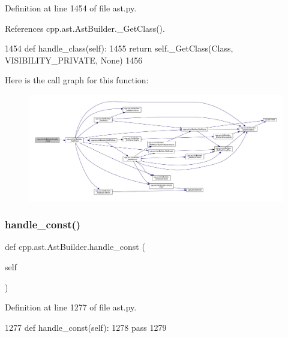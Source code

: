 Definition at line 1454 of file ast.\+py.



References cpp.\+ast.\+Ast\+Builder.\+\_\+\+Get\+Class().


\begin{DoxyCode}
1454     \textcolor{keyword}{def }handle\_class(self):
1455         \textcolor{keywordflow}{return} self.\_GetClass(Class, VISIBILITY\_PRIVATE, \textcolor{keywordtype}{None})
1456 
\end{DoxyCode}
Here is the call graph for this function\+:
\nopagebreak
\begin{figure}[H]
\begin{center}
\leavevmode
\includegraphics[width=350pt]{classcpp_1_1ast_1_1AstBuilder_a93bd39632593bec36972355b7e1893e0_cgraph}
\end{center}
\end{figure}
\mbox{\label{classcpp_1_1ast_1_1AstBuilder_a9d24135000a6fb4a3daabb5ab8883648}} 
\subsubsection{\texorpdfstring{handle\+\_\+const()}{handle\_const()}}
{\footnotesize\ttfamily def cpp.\+ast.\+Ast\+Builder.\+handle\+\_\+const (\begin{DoxyParamCaption}\item[{}]{self }\end{DoxyParamCaption})}



Definition at line 1277 of file ast.\+py.


\begin{DoxyCode}
1277     \textcolor{keyword}{def }handle\_const(self):
1278         \textcolor{keywordflow}{pass}
1279 
\end{DoxyCode}
\mbox{\label{classcpp_1_1ast_1_1AstBuilder_a4dae74f1d036f63fc1080962ab0208fc}} 
